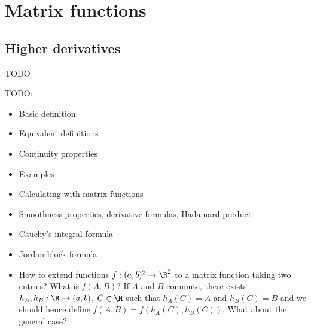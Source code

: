 \chapter{Matrix functions}

\section{Higher derivatives}

TODO

TODO:
\begin{itemize}
	\item Basic definition
	\item Equivalent definitions
	\item Continuity properties
	\item Examples
	\item Calculating with matrix functions
	\item Smoothness properties, derivative formulas, Hadamard product
	\item Cauchy's integral formula
	\item Jordan block formula
	\item How to extend functions $f : (a, b)^2 \to \R^{2}$ to a matrix function taking two entries? What is $f(A, B)$? If $A$ and $B$ commute, there exists $h_{A}, h_{B} : \R \to (a, b)$, $C \in \H$ such that $h_{A}(C) = A$ and $h_{B}(C) = B$ and we should hence define $f(A, B) = f(h_{A}(C), h_{B}(C))$. What about the general case?
\end{itemize}
